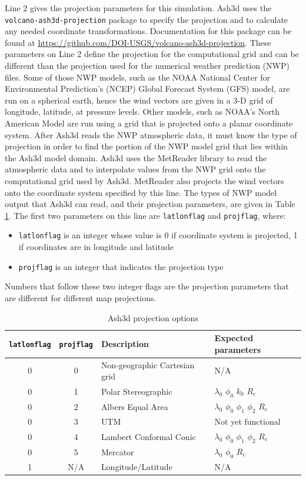 Line 2 gives the projection parameters for this simulation.
Ash3d uses the \texttt{volcano-ash3d-projection} package to specify the
projection and to calculate any needed coordinate transformations.
Documentation for this package can be found at
\url{https://github.com/DOI-USGS/volcano-ash3d-projection}.
These parameters on Line 2 define the projection for the computational
grid and can be different than the projection used for the numerical
weather prediction (NWP) files. Some of
those NWP models, such as the NOAA National Center for Environmental
Prediction’s (NCEP) Global Forecast System (GFS) model, are run
on a spherical earth, hence the wind vectors are given in a 3-D
grid of longitude, latitude, at pressure levels. Other models, such
as NOAA’s North American Model are run using a grid that is
projected onto a planar coordinate system. After Ash3d reads
the NWP atmospheric data, it must know the type of projection in order
to find the portion of the NWP model grid that lies within the
Ash3d model domain.
Ash3d uses the MetReader library to read the atmospheric data and to
interpolate values from the NWP grid onto the computational grid used
by Ash3d.  MetReader also projects the wind vectors onto the coordinate
system specified by this line.  
The types of NWP model output that
Ash3d can read, and their projection parameters, are given in
Table \ref{tab:ProjOpt}.
The first two parameters on this line are \texttt{latlonflag} and
\texttt{projflag},
where:
\begin{itemize}
 \item \texttt{latlonflag} is an integer whose value is 0 if coordinate system is
projected, 1 if coordinates are in longitude and latitude
 \item \texttt{projflag} is an integer that indicates the projection type
\end{itemize}
Numbers that follow these two integer flags are the projection parameters
that are different for different map projections.
\small
\begin{table}[htbp]
\begin{center}
\begin{tabular}{| c | c | l | l |}
\hline
\texttt{latlonflag} & \texttt{projflag} & Description & Expected parameters\\
\hline
0 & 0 & Non-geographic Cartesian grid & N/A \\
0 & 1 & Polar Stereographic & $\lambda_0$ $\phi_0$ $k_0$ $R_e$ \\
0 & 2 & Albers Equal Area & $\lambda_0$ $\phi_0$ $\phi_1$ $\phi_2$ $R_e$ \\
0 & 3 & UTM & Not yet functional \\
0 & 4 & Lambert Conformal Conic & $\lambda_0$ $\phi_0$ $\phi_1$ $\phi_2$ $R_e$\\
0 & 5 & Mercator & $\lambda_0$ $\phi_0$ $R_e$\\
1 & N/A & Longitude/Latitude & N/A \\
\hline
\end{tabular}
\caption{\label{tab:ProjOpt}Ash3d projection options}
\end{center}
\end{table}
